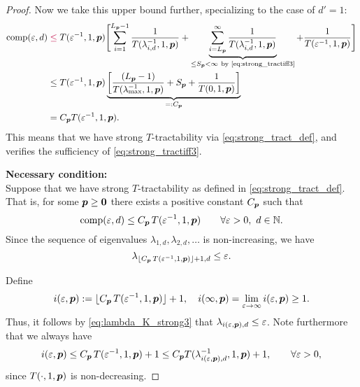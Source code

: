 \documentclass[11pt,a4paper]{article}
\newcommand{\peter}[1]{\begingroup\color{purple}#1\endgroup}
\begin{document}
\begin{proof}
Now we take this upper bound further, specializing to the case of $d'=1$:
\begin{align*}
       \comp(\varepsilon,d)
       & \peter{\le} T(\varepsilon^{-1},1, \vp) \Biggl [ \sum_{i=1}^{L_{\vp}-1} \frac{1}{T(\lambda_{i, d}^{-1},1,\vp)}
       + \underbrace{\sum_{i=L_{\vp}}^\infty \frac{1}{T(\lambda_{i, d}^{-1},1,\vp)}}_{\le S_{\vp} <\infty\ \text{by \eqref{eq:strong_tractiff3}} }
       + \frac{1}{T(\varepsilon^{-1},1, \vp)} \Biggr] \\
       & \le T(\varepsilon^{-1},1,\vp) \underbrace{\left[\frac{(L_{\vp}-1)}{T(\lambda_{\max}^{-1},1,\vp)} + S_{\vp} + \frac{1}{T(0,1, \vp)}\right]}_{=:C_{\vp}}\\
       & =  C_{\vp}T(\varepsilon^{-1},1,\vp).
\end{align*}
This means that we have strong $T$-tractability via \eqref{eq:strong_tract_def}, and verifies the sufficiency of \eqref{eq:strong_tractiff3}.



\bigskip
\noindent \textbf{Necessary condition:} \\
Suppose that we have strong
$T$-tractability as defined in \eqref{eq:strong_tract_def}. That is, for some $\boldsymbol{p} \ge \boldsymbol{0}$ there exists a positive constant $C_{\boldsymbol{p}}$ such that
\[
\operatorname{comp}(\varepsilon,d)\le C_{\boldsymbol{p}}\, T(\varepsilon^{-1},1,\boldsymbol{p})
\qquad \forall \varepsilon > 0, \ d \in \mathbb{N}.
\]
Since the sequence of eigenvalues $\lambda_{1,d}, \lambda_{2,d}, \ldots $ is non-increasing, we have
\begin{equation}\label{eq:lambda_K_strong3}
\lambda_{\lfloor C_{\boldsymbol{p}}\, T(\varepsilon^{-1},1,\boldsymbol{p})\rfloor +1,d}\le \varepsilon.
\end{equation}

Define
\[
i(\varepsilon,\boldsymbol{p}):= \lfloor C_{\boldsymbol{p}}\, T(\varepsilon^{-1},1,\boldsymbol{p})\rfloor +1, \quad
i(\infty,\boldsymbol{p}) = \lim_{\varepsilon \to \infty}  i(\varepsilon,\boldsymbol{p}) \ge 1 .
\]
Thus, it follows by \eqref{eq:lambda_K_strong3} that $\lambda_{i(\varepsilon,\boldsymbol{p}),d} \le \varepsilon$.
Note furthermore that we always have
\[
i(\varepsilon,\boldsymbol{p})\le C_{\boldsymbol{p}}\, T(\varepsilon^{-1},1,\boldsymbol{p})+1 \le C_{\boldsymbol{p}} T(\lambda_{i(\varepsilon,\boldsymbol{p}),d}^{-1},1,\boldsymbol{p})+1, \qquad \forall \varepsilon > 0,
\]
since
$T(\cdot,1, \boldsymbol{p})$ is non-decreasing.


\end{proof}
\end{document}
